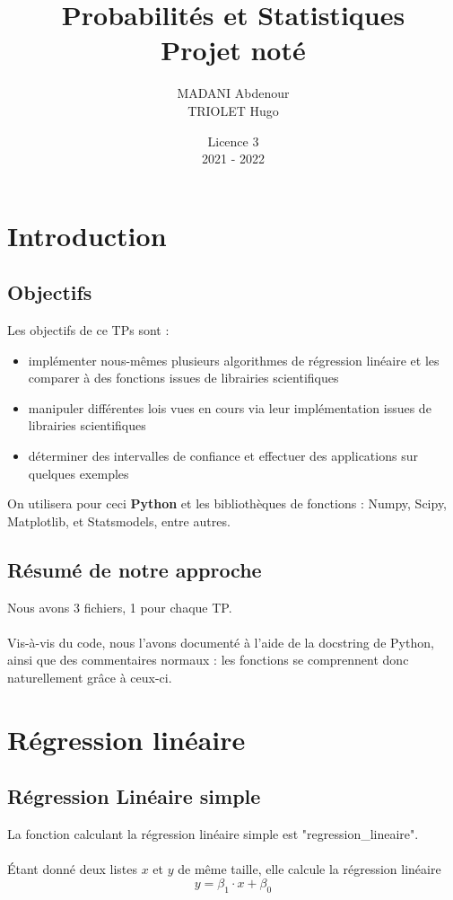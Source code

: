 \documentclass{article}      %
\title{Probabilités et Statistiques\\\Large{Projet noté}}
\author{MADANI Abdenour\\TRIOLET Hugo}
\date{Licence 3\\2021 - 2022}
\begin{document}
\normalsize
\maketitle

\renewcommand*\contentsname{Table des matières}
\tableofcontents
\newpage



\section{Introduction}
\subsection{Objectifs}
Les objectifs de ce TPs sont :
\begin{itemize}
  \item implémenter nous-mêmes plusieurs algorithmes de régression linéaire et les comparer à des fonctions issues de librairies scientifiques
  \item manipuler différentes lois vues en cours via leur implémentation issues de librairies scientifiques
  \item déterminer des intervalles de confiance et effectuer des applications sur quelques exemples
\end{itemize}

On utilisera pour ceci \textbf{Python} et les bibliothèques de fonctions : Numpy, Scipy, Matplotlib, et Statsmodels, entre autres.


\subsection{Résumé de notre approche}
Nous avons 3 fichiers, 1 pour chaque TP.
\\%
\\Vis-à-vis du code, nous l’avons documenté à l’aide de la docstring de Python, ainsi que des commentaires normaux : les fonctions se comprennent donc naturellement grâce à ceux-ci.

\section{Régression linéaire}
\subsection{Régression Linéaire simple}
La fonction calculant la régression linéaire simple est "regression\_lineaire".
\\%
\\Étant donné deux listes $x$ et $y$ de même taille, elle calcule la régression linéaire $$y = \beta_1 \cdot x + \beta_0$$
%
\end{document}
